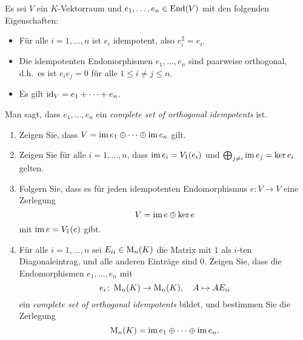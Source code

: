 \documentclass[a4paper,10pt]{scrartcl}
\begin{document}
\begin{question}
  Es sei $V$ ein $K$-Vektorraum und $e_1, \dotsc, e_n \in \operatorname{End}(V)$ mit den folgenden Eigenschaften:
  \begin{itemize}
    \item
      Für alle $i = 1, \dotsc, n$ ist $e_i$ idempotent, also $e_i^2 = e_i$.
    \item
      Die idempotenten Endomorphismen $e_1, \dotsc, e_n$ sind paarweise orthogonal, d.h.\ es ist $e_i e_j = 0$ für alle $1 \leq i \neq j \leq n$.
    \item
      Es gilt $\operatorname{id}_V = e_1 + \dotsb + e_n$.
  \end{itemize}
  Man sagt, dass $e_1, \dotsc, e_n$ ein \emph{complete set of orthogonal idempotents} ist.
  \begin{enumerate}[leftmargin=*]
    \item
      Zeigen Sie, dass $V = \operatorname{im} e_1 \oplus \dotsb \oplus \operatorname{im} e_n$ gilt.
    \item
      Zeigen Sie für alle $i = 1, \dotsc, n$, dass $\operatorname{im} e_i = V_1(e_i)$ und $\bigoplus_{j \neq i} \operatorname{im} e_j = \ker e_i$ gelten.
    \item
      Folgern Sie, dass es für jeden idempotenten Endomorphismus $e \colon V \to V$ eine Zerlegung
      \[
        V = \operatorname{im} e \oplus \ker e
      \]
      mit $\operatorname{im} e = V_1(e)$ gibt.
    \item
      Für alle $i = 1, \dotsc, n$ sei $E_{ii} \in \operatorname{M}_n(K)$ die Matrix mit $1$ als $i$-ten Diagonaleintrag, und alle anderen Einträge sind $0$.
      Zeigen Sie, dass die Endomorphismen $e_1, \dotsc, e_n$ mit
      \[
        e_i \colon \operatorname{M}_n(K) \to \operatorname{M}_n(K),
        \quad
        A \mapsto A E_{ii}
      \]
      ein \emph{complete set of orthogonal idempotents} bildet, und bestimmen Sie die Zerlegung
      \[
        \operatorname{M}_n(K) = \operatorname{im} e_1 \oplus \dotsb \oplus \operatorname{im} e_n.
      \]
  \end{enumerate}
\end{question}
\end{document}
